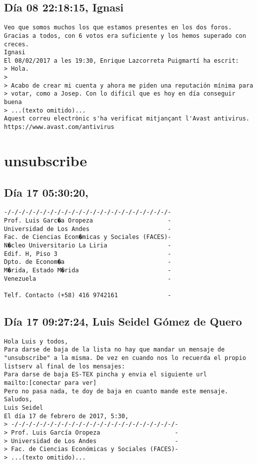 \documentclass[a4paper,10pt]{article}
\begin{document}
\subsection{Día 08 22:18:15, Ignasi}

\begin{lstlisting}
Veo que somos muchos los que estamos presentes en los dos foros.
Gracias a todos, con 6 votos era suficiente y los hemos superado con creces.
Ignasi
El 08/02/2017 a les 19:30, Enrique Lazcorreta Puigmartí ha escrit:
> Hola.
>
> Acabo de crear mi cuenta y ahora me piden una reputación mínima para 
> votar, como a Josep. Con lo difícil que es hoy en día conseguir buena 
> ...(texto omitido)...
Aquest correu electrònic s'ha verificat mitjançant l'Avast antivirus.
https://www.avast.com/antivirus

\end{lstlisting}
\section{unsubscribe}

\subsection{Día 17 05:30:20, }

\begin{lstlisting}
-/-/-/-/-/-/-/-/-/-/-/-/-/-/-/-/-/-/-/-/-/-/-/-
Prof. Luis Garc�a Oropeza                     -
Universidad de Los Andes                      -
Fac. de Ciencias Econ�micas y Sociales (FACES)-
N�cleo Universitario La Liria                 -
Edif. H, Piso 3                               -
Dpto. de Econom�a                             -
M�rida, Estado M�rida                         -
Venezuela                                     -

Telf. Contacto (+58) 416 9742161              -

\end{lstlisting}

\subsection{Día 17 09:27:24, Luis Seidel Gómez de Quero}

\begin{lstlisting}
Hola Luis y todos,
Para darse de baja de la lista no hay que mandar un mensaje de
"unsubscribe" a la misma. De vez en cuando nos lo recuerda el propio
listserv al final de los mensajes:
Para darse de baja ES-TEX pincha y envia el siguiente url
mailto:[conectar para ver]
Pero no pasa nada, te doy de baja en cuanto mande este mensaje.
Saludos,
Luis Seidel
El día 17 de febrero de 2017, 5:30,  
> -/-/-/-/-/-/-/-/-/-/-/-/-/-/-/-/-/-/-/-/-/-/-/-
> Prof. Luis García Oropeza                     -
> Universidad de Los Andes                      -
> Fac. de Ciencias Económicas y Sociales (FACES)-
> ...(texto omitido)...

\end{lstlisting}
\end{document}
